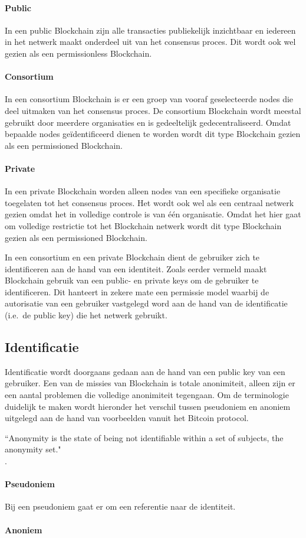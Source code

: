 \paragraph{Public} In een public Blockchain zijn alle transacties publiekelijk inzichtbaar en iedereen in het netwerk maakt onderdeel uit van het consensus proces. Dit wordt ook wel gezien als een permissionless Blockchain.

\paragraph{Consortium} In een consortium Blockchain is er een groep van vooraf geselecteerde nodes die deel uitmaken van het consensus proces. De consortium Blockchain wordt meestal gebruikt door meerdere organisaties en is gedeeltelijk gedecentraliseerd. Omdat bepaalde nodes geïdentificeerd dienen te worden wordt dit type Blockchain gezien als een permissioned Blockchain.

\clearpage
\paragraph{Private} In een private Blockchain worden alleen nodes van een specifieke organisatie toegelaten tot het consensus proces. Het wordt ook wel als een centraal netwerk gezien omdat het in volledige controle is van één organisatie. Omdat het hier gaat om volledige restrictie tot het Blockchain netwerk wordt dit type Blockchain gezien als een permissioned Blockchain.

In een consortium en een private Blockchain dient de gebruiker zich te identificeren aan de hand van een identiteit. Zoals eerder vermeld maakt Blockchain gebruik van een public- en private keys om de gebruiker te identificeren. Dit hanteert in zekere mate een permissie model waarbij de autorisatie van een gebruiker vastgelegd word aan de hand van de identificatie (i.e.\ de public key) die het netwerk gebruikt.

\subsection{Identificatie}

Identificatie wordt doorgaans gedaan aan de hand van een public key van een gebruiker. Een van de missies van Blockchain is totale anonimiteit, alleen zijn er een aantal problemen die volledige anonimiteit tegengaan. Om de terminologie duidelijk te maken wordt hieronder het verschil tussen pseudoniem en anoniem uitgelegd aan de hand van voorbeelden vanuit het Bitcoin protocol.

\begin{formal}
  ``Anonymity is the state of being not identifiable within a set of subjects, the anonymity set."
  \\ \cite{pfitzmann2001anonymity}.
\end{formal}

\paragraph{Pseudoniem} 

Bij een pseudoniem gaat er om een referentie naar de identiteit. 

\paragraph{Anoniem}






